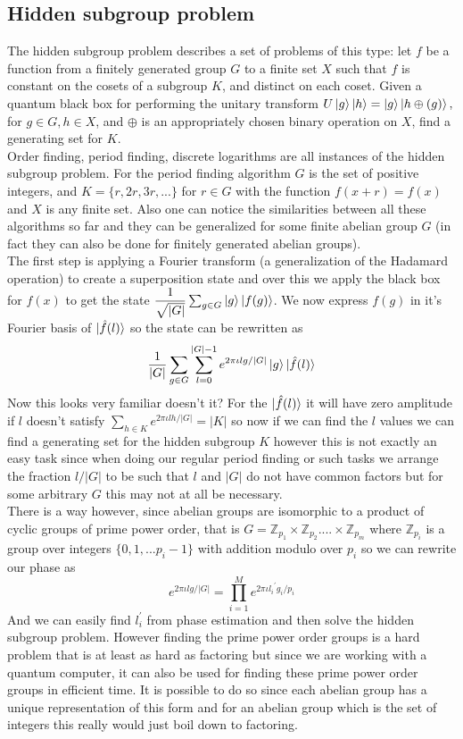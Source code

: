 \documentclass{report}
\begin{document}
\subsection{Hidden subgroup problem}
The hidden subgroup problem describes a set of problems of this type: let $f$ be a function from a finitely generated group $G$ to a finite set $X$ such that $f$ is constant on the cosets of a subgroup $K$, and distinct on each coset. Given a quantum black box for performing the unitary transform $U\ket{g}\ket{h} = \ket{g}\ket{h\oplus(g)},$ for $g \in G, h \in X$, and $\oplus$ is an appropriately chosen binary operation on $X$, find a generating set for $K$.\\
Order finding, period finding, discrete logarithms are all instances of the hidden subgroup problem. For the period finding algorithm $G$ is the set of positive integers, and $K = \{r,2r,3r,...\}$ for $r \in G$ with the function $f(x+r) = f(x)$ and $X$ is any finite set. Also one can notice the similarities between all these algorithms so far and they can be generalized for some finite abelian group $G$ (in fact they can also be done for finitely generated abelian groups).\\
The first step is applying a Fourier transform (a generalization of the Hadamard operation) to create a superposition state and over this we apply the black box for $f(x)$ to get the state $\dfrac{1}{\sqrt{|G|}}\sum_{g\in{G}}\ket{g}\ket{f(g)}$. We now express $f(g)$ in it's Fourier basis of $\ket{\hat{f}(l)}$ so the state can be rewritten as 
$$\dfrac{1}{|G|}\sum_{g\in{G}}\sum_{l=0}^{|G|-1}e^{2\pi\iota{lg}/|G|}\ket{g}\ket{\hat{f}(l)}$$
Now this looks very familiar doesn't it? For the $\ket{\hat{f}(l)}$ it will have zero amplitude if $l$ doesn't satisfy $\sum_{h\in{K}}e^{2\pi\iota{lh}/|G|} = |K|$ so now if we can find the $l$ values we can find a generating set for the hidden subgroup $K$ however this is not exactly an easy task since when doing our regular period finding or such tasks we arrange the fraction $l/|G|$ to be such that $l$ and $|G|$ do not have common factors but for some arbitrary $G$ this may not at all be necessary.\\
There is a way however, since abelian groups are isomorphic to a product of cyclic groups of prime power order, that is $G = \mathbb{Z}_{p_1} \times \mathbb{Z}_{p_2} ....\times \mathbb{Z}_{p_m}$ where $\mathbb{Z}_{p_i}$ is a group over integers $\{0,1,...{p_i-1}\}$ with addition modulo over $p_i$ so we can rewrite our phase as
$$e^{2\pi\iota{lg}/|G|} = \prod_{i=1}^{M}e^{2\pi\iota{{l_i}^{'}g_i}/{p_i}}$$
And we can easily find $l_{i}^{'}$ from phase estimation and then solve the hidden subgroup problem. However finding the prime power order groups is a hard problem that is at least as hard as factoring but since we are working with a quantum computer, it can also be used for finding these prime power order groups in efficient time. It is possible to do so since each abelian group has a unique representation of this form and for an abelian group which is the set of integers this really would just boil down to factoring.
\end{document}
